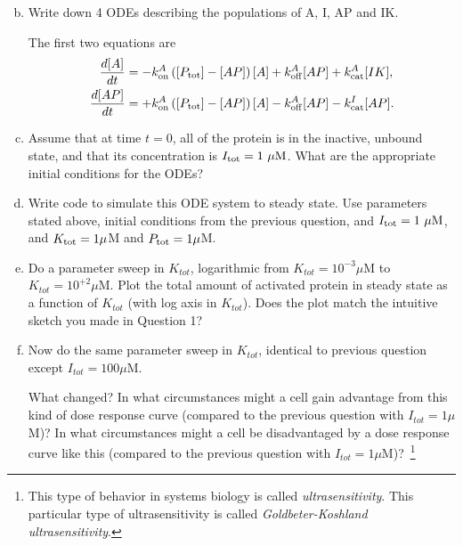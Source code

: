 \documentclass{exam}
\begin{document}
\begin{enumerate}[a.]
\setcounter{enumi}{1}
\item Write down 4 ODEs describing the populations of A, I, AP and IK.  

The first two equations are
\begin{align}
\frac{d{[A]}}{dt} &= -k_{\rm on}^A \left( [P_{\rm tot}] - [AP]\right) [A] + k_{\rm off}^A [AP] + k_{\rm cat}^A [IK],\\
\frac{d{[AP]}}{dt} &= +k_{\rm on}^A \left( [P_{\rm tot}] - [AP]\right) [A] - k_{\rm off}^A [AP] - k_{\rm cat}^I [AP].
\end{align}

\item Assume that at time $t=0$, all of the protein is in the inactive, unbound state, and that its concentration is $I_{\rm tot}=1~\mu\mbox{M}$. What are the appropriate initial conditions for the ODEs? 

\item Write code to simulate this ODE system to steady state. Use parameters stated above, initial conditions from the previous question, and $I_{\rm tot}=1~\mu\mbox{M}$, and $K_{\rm tot}=1\mu$M and $P_{\rm tot}=1\mu$M.

\item Do a parameter sweep in $K_{tot}$, logarithmic from $K_{tot} = 10^{-3} \mu$M to $K_{tot} = 10^{+2} \mu$M. Plot the total amount of activated protein in steady state as a function of $K_{tot}$ (with log axis in $K_{tot}$). Does the plot match the intuitive sketch you made in Question 1? 



\item Now do the same parameter sweep in $K_{tot}$, identical to previous question except $I_{tot}=100\mu$M. 

What changed? In what circumstances might a cell gain advantage from this kind of dose response curve (compared to the previous question with $I_{tot}=1\mu$M)? In what circumstances might a cell be disadvantaged by a dose response curve like this (compared to the previous question with $I_{tot}=1\mu$M)?~\footnote{This type of behavior in systems biology is called \emph{ultrasensitivity}. This particular type of ultrasensitivity is called \emph{Goldbeter-Koshland ultrasensitivity}.}


\end{enumerate}





  
\end{document}
